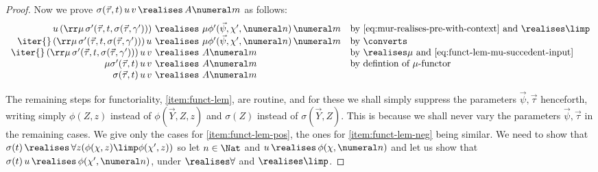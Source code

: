 \begin{proof}
    Now we prove $\sigma(\vec \tau,t)\, u\, v\, \realises\, A\numeral m$ as follows:
    \[
    \begin{array}{r@{\ \realises \ }ll}
          u\, (\rr\mu\, \sigma'(\vec \tau,t,\sigma(\vec \tau,\gamma'))) & \mu\phi'(\vec \psi,\chi',\numeral n)\, \numeral m & \text{by \eqref{eq:mur-realises-pre-with-context} and $\realises\limp$}\\
          \iter{}\, (\rr\mu\, \sigma'(\vec \tau,t,\sigma(\vec \tau,\gamma')))\, u & \mu\phi'(\vec \psi,\chi',\numeral n)\, \numeral m & \text{by $\converts$} \\
          \iter{}\, (\rr\mu\, \sigma'(\vec \tau,t,\sigma(\vec \tau,\gamma')))\, u\, v & A \numeral m & \text{by $\realises \mu$ and \eqref{eq:funct-lem-mu-succedent-input}} \\
          \mu \sigma'(\vec \tau,t) \, u \, v & A\numeral m & \text{by defintion of $\mu$-functor} \\
          \sigma(\vec \tau,t)\, u\, v & A\numeral m
    \end{array}
    \]


    The remaining steps for functoriality, \eqref{item:funct-lem}, are routine, and for these we shall simply suppress the parameters $\vec \psi,\vec \tau$ henceforth, writing simply $\phi(Z,z)$ instead of $\phi(\vec Y,Z,z)$ and $\sigma(Z)$ instead of $\sigma(\vec Y,Z)$.
    This is because we shall never vary the parameters $\vec \psi,\vec \tau$ in the remaining cases.
    We give only the cases for \cref{item:funct-lem-pos}, the ones for \cref{item:funct-lem-neg} being similar.
     We need to show that $\sigma(t) \, \realises\, \forall z (\phi(\chi,z) \limp \phi(\chi',z))$ so let $n\in \Nat$ and $u\, \realises\, \phi(\chi,\numeral n)$ and let us show that $\sigma(t)\, u\,  \realises\, \phi(\chi',\numeral n)$, under $\realises\forall$ and $\realises\limp$.


\end{proof}
